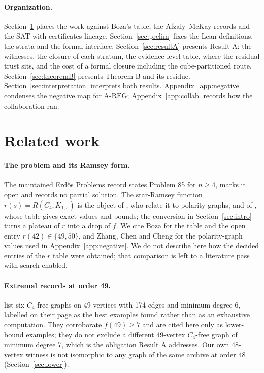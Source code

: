 \documentclass{anvil-paper}
\newcommand{\AREG}{\mathrm{A\text{-}REG}}
\theoremstyle{definition}
\begin{document}
\paragraph{Organization.} Section~\ref{sec:related} places the work against Boza's table, the Afzaly--McKay records and the SAT-with-certificates lineage. Section~\ref{sec:prelim} fixes the Lean definitions, the strata and the formal interface. Section~\ref{sec:resultA} presents Result A: the witnesses, the closure of each stratum, the evidence-level table, where the residual trust sits, and the cost of a formal closure including the cube-partitioned route. Section~\ref{sec:theoremB} presents Theorem B and its residue. Section~\ref{sec:interpretation} interprets both results. Appendix~\ref{app:negative} condenses the negative map for $\AREG$; Appendix~\ref{app:collab} records how the collaboration ran.

\section{Related work}\label{sec:related}

\paragraph{The problem and its Ramsey form.} The maintained Erdős Problems record \citep{bloom-erdos85} states Problem 85 for $n\ge 4$, marks it open and records no partial solution. The star-Ramsey function $r(s)=R(C_4,K_{1,s})$ is the object of \citet{zhang2017polarity}, who relate it to polarity graphs, and of \citet{boza2024ramsey}, whose table gives exact values and bounds; the conversion in Section~\ref{sec:intro} turns a plateau of $r$ into a drop of $f$. We cite Boza for the table and the open entry $r(42)\in\{49,50\}$, and Zhang, Chen and Cheng for the polarity-graph values used in Appendix~\ref{app:negative}. We do not describe here how the decided entries of the $r$ table were obtained; that comparison is left to a literature pass with search enabled.

\paragraph{Extremal records at order 49.} \citet{afzaly-mckay-extremal} list six $C_4$-free graphs on 49 vertices with 174 edges and minimum degree 6, labelled on their page as the best examples found rather than as an exhaustive computation. They corroborate $f(49)\ge 7$ and are cited here only as lower-bound examples; they do not exclude a different 49-vertex $C_4$-free graph of minimum degree 7, which is the obligation Result A addresses. Our own 48-vertex witness is not isomorphic to any graph of the same archive at order 48 (Section~\ref{sec:lower}).
\end{document}
